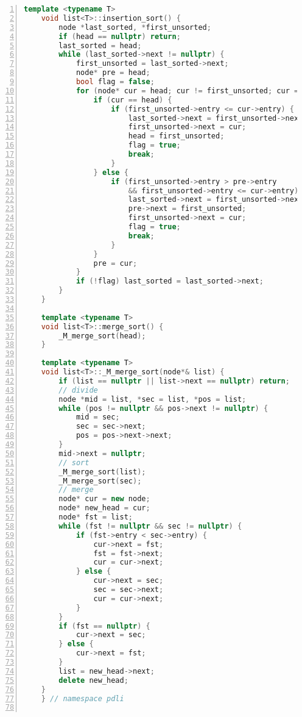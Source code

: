 \documentclass{article}
\begin{document}
\begin{lstlisting}[xleftmargin = 2em,xrightmargin = 2em, aboveskip = 0.5em, numbers = left, language = C++]
    template <typename T>
    void list<T>::insertion_sort() {
        node *last_sorted, *first_unsorted;
        if (head == nullptr) return;
        last_sorted = head;
        while (last_sorted->next != nullptr) {
            first_unsorted = last_sorted->next;
            node* pre = head;
            bool flag = false;
            for (node* cur = head; cur != first_unsorted; cur = cur->next) {
                if (cur == head) {
                    if (first_unsorted->entry <= cur->entry) {
                        last_sorted->next = first_unsorted->next;
                        first_unsorted->next = cur;
                        head = first_unsorted;
                        flag = true;
                        break;
                    }
                } else {
                    if (first_unsorted->entry > pre->entry
                        && first_unsorted->entry <= cur->entry) {
                        last_sorted->next = first_unsorted->next;
                        pre->next = first_unsorted;
                        first_unsorted->next = cur;
                        flag = true;
                        break;
                    }
                }
                pre = cur;
            }
            if (!flag) last_sorted = last_sorted->next;
        }
    }

    template <typename T>
    void list<T>::merge_sort() {
        _M_merge_sort(head);
    }

    template <typename T>
    void list<T>::_M_merge_sort(node*& list) {
        if (list == nullptr || list->next == nullptr) return;
        // divide
        node *mid = list, *sec = list, *pos = list;
        while (pos != nullptr && pos->next != nullptr) {
            mid = sec;
            sec = sec->next;
            pos = pos->next->next;
        }
        mid->next = nullptr;
        // sort
        _M_merge_sort(list);
        _M_merge_sort(sec);
        // merge
        node* cur = new node;
        node* new_head = cur;
        node* fst = list;
        while (fst != nullptr && sec != nullptr) {
            if (fst->entry < sec->entry) {
                cur->next = fst;
                fst = fst->next;
                cur = cur->next;
            } else {
                cur->next = sec;
                sec = sec->next;
                cur = cur->next;
            }
        }
        if (fst == nullptr) {
            cur->next = sec;
        } else {
            cur->next = fst;
        }
        list = new_head->next;
        delete new_head;
    }
    } // namespace pdli


\end{lstlisting}
\end{document}
